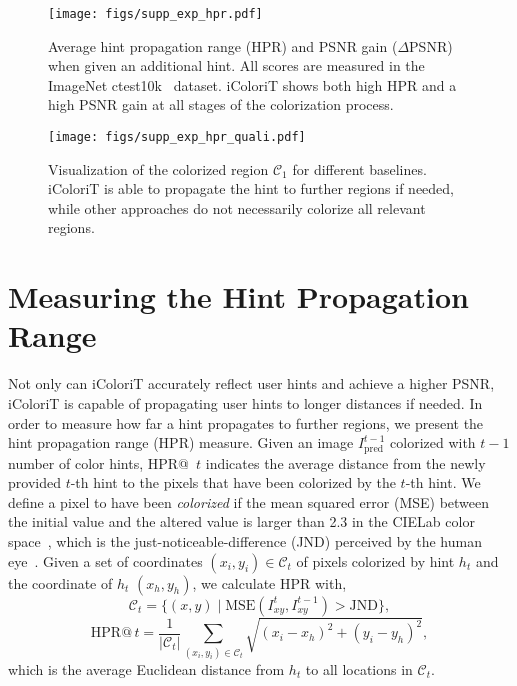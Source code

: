 \documentclass[10pt,twocolumn,letterpaper]{article}
\begin{document}
\begin{figure*}[t]
    \centering
    \texttt{[image: figs/supp\_exp\_hpr.pdf]}
    \vspace{-0.45cm}
    \caption{Average hint propagation range (HPR) and PSNR gain ($\Delta$PSNR) when given an additional hint. All scores are measured in the ImageNet ctest10k~\cite{ctest} dataset. iColoriT shows both high HPR and a high PSNR gain at all stages of the colorization process. }
    \label{fig:exp_quanti_hpr}
    \vspace{-0.2cm}
\end{figure*}


\begin{figure}[t]
    \centering
    \texttt{[image: figs/supp\_exp\_hpr\_quali.pdf]}
    \vspace{-0.5cm}
    \caption{Visualization of the colorized region $\mathcal{C}_1$ for different baselines. iColoriT is able to propagate the hint to further regions if needed, while other approaches do not necessarily colorize all relevant regions. }
    \label{fig:exp_hpr_quali}
    \vspace{-0.5cm}
\end{figure}

\vspace{+0.1cm}
\section{Measuring the Hint Propagation Range}
\label{sec:hpr} 
Not only can iColoriT accurately reflect user hints and achieve a higher PSNR, iColoriT is capable of propagating user hints to longer distances if needed. 
In order to measure how far a hint propagates to further regions, we present the hint propagation range (HPR) measure. 
Given an image $I_{\text{pred}}^{t-1}$ colorized with $t-1$ number of color hints, HPR@~$t$ indicates the average distance from the newly provided $t$-th hint to the pixels that have been colorized by the $t$-th hint. 
We define a pixel to have been \textit{colorized} if the mean squared error (MSE) between the initial value and the altered value is larger than 2.3 in the CIELab color space~\cite{cie}, which is the just-noticeable-difference (JND) perceived by the human eye~\cite{jnd}. 
Given a set of coordinates $(x_i,y_i) \in \mathcal{C}_t$ of pixels colorized by hint $h_t$ and the coordinate of $h_t$ $(x_h, y_h)$, we calculate HPR with, 
\begin{equation}
    \mathcal{C}_t = \{(x, y)\;| \; \text{MSE}(I^t_{x y}, I^{t-1}_{x y}) > \text{JND} \},
\end{equation}
\begin{equation}
    \text{HPR}@\,t = \frac{1}{|\mathcal{C}_t|}\sum_{(x_i, y_i)\in \mathcal{C}_t} \sqrt{(x_i - x_h)^2 + (y_i-y_h)^2},
\end{equation}
which is the average Euclidean distance from $h_t$ to all locations in $\mathcal{C}_t$.
\end{document}
